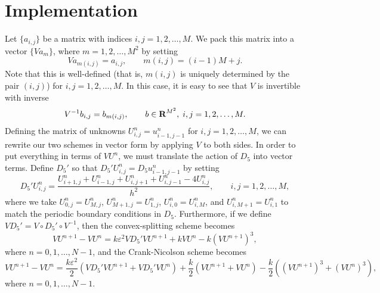 \documentclass{article}
\begin{document}
	\section{Implementation}
	Let $\{a_{i,j}\}$ be a matrix with indices $i,j=1,2,\dots, M$. We pack this matrix into a vector $\{Va_m\}$, where $m = 1,2,\dots, M^2$ by setting
	\begin{equation}
		\label{eq:V}
		Va_{m(i,j)} = a_{i,j}, \qquad  m(i,j) = (i-1)M+j.
	\end{equation}
	Note that this is well-defined (that is, $m(i,j)$ is uniquely determined by the pair $(i,j)$) for $i,j=1,2,\dots, M$. In this case, it is easy to see that $V$ is invertible with inverse
	\begin{equation}
		\label{eq:V_inv}
		V^{-1}b_{i,j} = b_{m(i,j)}, \qquad b \in \textnormal{\bf R}^{M^2}, \; i,j=1,2,\dots, M.
	\end{equation}
	Defining the matrix of unknowns $U^n_{i,j} = u^n_{i-1,j-1}$ for $i,j = 1,2,\dots, M$, we can rewrite our two schemes in vector form by applying $V$ to both sides. In order to put everything in terms of $VU^n$, we must translate the action of $D_5$ into vector terms. Define $D_5'$ so that $D_5'U^n_{i,j} = D_5u^n_{i-1,j-1}$ by setting
	\begin{equation}
		D_5'U^n_{i,j} = \frac{U^n_{i+1,j} + U^n_{i-1,j} + U^n_{i,j+1} + U^n_{i,j-1} - 4U^n_{i,j}}{h^2}, \qquad i,j =1,2,\dots, M,
	\end{equation}
	where we take $U^n_{0,j} = U^n_{M,j}$, $U^n_{M+1,j} = U^n_{1,j}$, $U^n_{i,0} = U^n_{i,M}$, and $U^n_{i,M+1} = U^n_{i,1}$ to match the periodic boundary conditions in $D_5$. Furthermore, if we define $VD_5' = V\circ D_5' \circ V^{-1}$, then the convex-splitting scheme becomes
	\begin{equation}
		VU^{n+1} - VU^n = k\varepsilon^2VD_5'VU^{n+1} + kVU^n - k(VU^{n+1})^3,
	\end{equation}
	where $n = 0,1,\dots, N-1$, and the Crank-Nicolson scheme becomes
	\begin{equation}
		VU^{n+1} - VU^n = \frac{k\varepsilon^2}{2}\left(VD_5'VU^{n+1} + VD_5'VU^n\right) + \frac{k}{2}\left(VU^{n+1} + VU^n\right) - \frac{k}{2}\left((VU^{n+1})^3 + (VU^n)^3\right),
	\end{equation}
	where $n = 0,1,\dots, N-1$.
	
\end{document}
